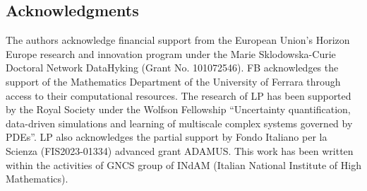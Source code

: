 \documentclass[10pt,a4paper]{article}
\theoremstyle{theorem}
\numberwithin{equation}{section}
\begin{document}
\subsection*{Acknowledgments}
The authors acknowledge financial support from the European Union’s Horizon Europe research and innovation
program under the Marie Sklodowska-Curie Doctoral Network DataHyking (Grant No. 101072546).
FB acknowledges the support of the Mathematics Department of the University of Ferrara
through access to their computational resources. The research of LP has been supported by the Royal
Society under the Wolfson Fellowship “Uncertainty quantification, data-driven simulations and learning
of multiscale complex systems governed by PDEs”. LP also acknowledges the partial support by Fondo
Italiano per la Scienza (FIS2023-01334) advanced grant ADAMUS. This work has been written within
the activities of GNCS group of INdAM (Italian National Institute of High Mathematics).




\end{document}
